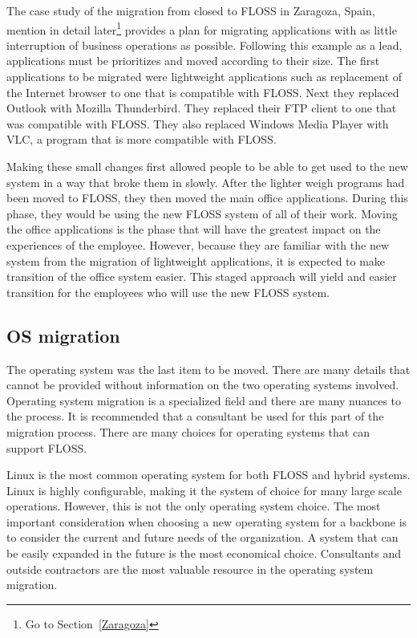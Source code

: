     The case study of the migration from closed to FLOSS in Zaragoza, Spain,   mention in detail later\footnote{Go to Section~\ref{Zaragoza}} provides a plan for migrating applications with as little interruption of business operations as possible. Following this example as a lead, applications must be prioritizes and moved according to their size.  The first applications to be migrated were lightweight  applications such as replacement of the Internet browser to one that is compatible with FLOSS. Next they replaced Outlook with Mozilla Thunderbird. They replaced their FTP client to one that was compatible with FLOSS. They also replaced Windows Media Player with VLC, a program that is more compatible with FLOSS. 
    
     Making these small changes first allowed people to be able to get used to the new system in a way that broke them in slowly. After the lighter weigh programs had been moved to FLOSS, they then moved the main office applications. During this phase, they would be using the new FLOSS system of all of their work. Moving the office applications is the phase that will have the greatest impact on the experiences of the employee. However, because they are familiar with the new system from the migration of lightweight applications, it is expected to make transition of the office system easier. This staged approach will yield and easier transition for the employees who will use the new FLOSS system.          
  
   \subsection{OS migration}
    \label{opensource_OS} 
    The operating system was the last item to be moved.  There are many details that cannot be provided without information on the two operating systems involved. Operating system migration is a specialized field and there are many nuances to the process. It is recommended that a consultant be used for this part of the migration process. There are many choices for operating systems that can support FLOSS.
    
    Linux is the most common operating system for both FLOSS and hybrid systems. Linux is highly configurable, making it the system of choice for many large scale operations. However, this is not the only operating system choice. The most important consideration when choosing a new operating system for a backbone is to consider the current and future needs of the organization. A system that can be easily expanded in the future is the most economical choice. Consultants and outside contractors are the most valuable resource in the operating system migration. 
    
